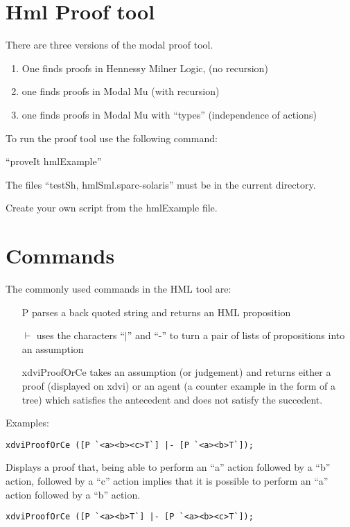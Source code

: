\documentclass[12pt]{article}
\begin{document}
\section{Hml Proof tool}
There are three versions of the modal proof tool.
\begin{enumerate}
\item One finds proofs in Hennessy Milner Logic, (no recursion)
\item one finds proofs in Modal Mu (with recursion)
\item one finds proofs in Modal Mu with ``types'' (independence of actions)
\end{enumerate}

To run the proof tool use the following command:

``proveIt hmlExample''

The files ``testSh, hmlSml.sparc-solaris'' must be in the current directory.

Create your own script from the hmlExample file.




\section{Commands}
The commonly used commands in the HML tool are:

\begin{itemize}
\item[P] parses a back quoted string and returns an HML proposition
\item[$\vdash$] uses the characters ``$\mid$'' and ``-'' to
      turn a pair of lists of propositions into an assumption
\item[xdviProofOrCe] takes an assumption (or judgement) and returns
     either a proof (displayed on xdvi) or an agent (a counter example
     in the form of a tree) which satisfies the antecedent
     and does not satisfy the succedent.
\end{itemize}

Examples:

\begin{verbatim}
xdviProofOrCe ([P `<a><b><c>T`] |- [P `<a><b>T`]);
\end{verbatim}

Displays a proof that, being able to perform an ``a'' action followed by
a ``b'' action, followed by a ``c'' action implies that it is possible to
perform an ``a'' action followed by a ``b'' action.

\begin{verbatim}
xdviProofOrCe ([P `<a><b>T`] |- [P `<a><b><c>T`]);
\end{verbatim}
\end{document}
